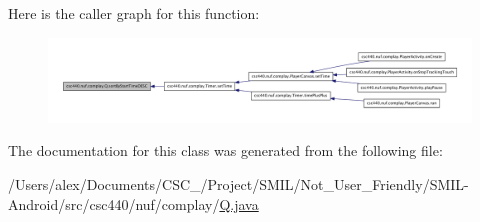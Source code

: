 Here is the caller graph for this function\-:
\nopagebreak
\begin{figure}[H]
\begin{center}
\leavevmode
\includegraphics[width=350pt]{classcsc440_1_1nuf_1_1complay_1_1_q_a935d3fbb201ad281bfc122c616335413_icgraph}
\end{center}
\end{figure}




The documentation for this class was generated from the following file\-:\begin{DoxyCompactItemize}
\item 
/\-Users/alex/\-Documents/\-C\-S\-C\-\_/\-Project/\-S\-M\-I\-L/\-Not\-\_\-\-User\-\_\-\-Friendly/\-S\-M\-I\-L-\/\-Android/src/csc440/nuf/complay/\hyperlink{_q_8java}{Q.\-java}\end{DoxyCompactItemize}
